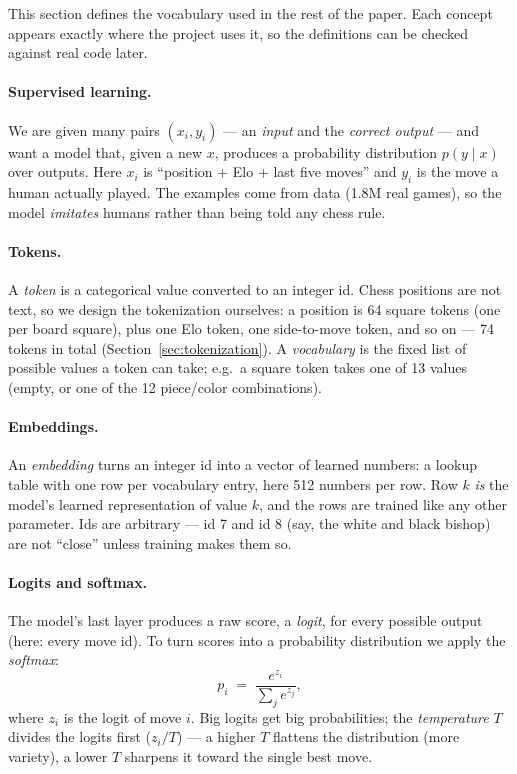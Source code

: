 \documentclass[10pt,a4paper]{article}
\begin{document}
This section defines the vocabulary used in the rest of the paper. Each
concept appears exactly where the project uses it, so the definitions can
be checked against real code later.

\paragraph{Supervised learning.} We are given many pairs $(x_i, y_i)$ ---
an \emph{input} and the \emph{correct output} --- and want a model that,
given a new $x$, produces a probability distribution $p(y \mid x)$ over
outputs. Here $x_i$ is ``position + Elo + last five moves'' and $y_i$ is
the move a human actually played. The examples come from data (1.8M real
games), so the model \emph{imitates} humans rather than being told any
chess rule.

\paragraph{Tokens.} A \emph{token} is a categorical value converted to an
integer id. Chess positions are not text, so we design the tokenization
ourselves: a position is 64 square tokens (one per board square), plus
one Elo token, one side-to-move token, and so on --- 74 tokens in total
(Section~\ref{sec:tokenization}). A \emph{vocabulary} is the fixed list
of possible values a token can take; e.g.\ a square token takes one of 13
values (empty, or one of the 12 piece/color combinations).

\paragraph{Embeddings.} An \emph{embedding} turns an integer id into a
vector of learned numbers: a lookup table with one row per vocabulary
entry, here 512 numbers per row. Row $k$ \emph{is} the model's learned
representation of value $k$, and the rows are trained like any other
parameter. Ids are arbitrary --- id 7 and id 8 (say, the white and black
bishop) are not ``close'' unless training makes them so.

\paragraph{Logits and softmax.} The model's last layer produces a raw
score, a \emph{logit}, for every possible output (here: every move id). To
turn scores into a probability distribution we apply the
\emph{softmax}:
\begin{equation}
p_i \;=\; \frac{e^{z_i}}{\sum_j e^{z_j}},
\label{eq:softmax}
\end{equation}
where $z_i$ is the logit of move $i$. Big logits get big probabilities;
the \emph{temperature} $T$ divides the logits first
($z_i/T$) --- a higher $T$ flattens the distribution (more variety), a
lower $T$ sharpens it toward the single best move.
\end{document}
